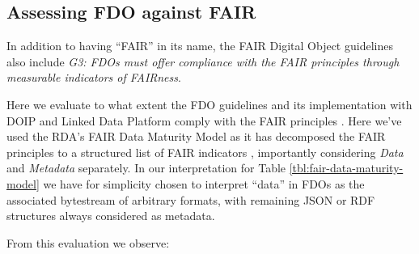 \documentclass[fleqn,10pt,NOlineno]{wlpeerjlua}
\begin{document}



\subsection*{Assessing FDO against FAIR}\label{sec:fair-compare}

In addition to having ``FAIR'' in its name, the FAIR Digital Object guidelines \autocite{fdo-RequirementSpec} also include \emph{G3: FDOs must offer compliance with the FAIR principles through measurable indicators of FAIRness}.

Here we evaluate to what extent the FDO guidelines and its implementation with DOIP and Linked Data Platform \autocite{FDOFramework} comply with the FAIR principles \autocite{wilkinsonFAIRGuidingPrinciples2016e}. Here we've used the RDA's FAIR Data Maturity Model \autocite{groupFAIRDataMaturity2020} as it has decomposed the FAIR principles to a structured list of FAIR indicators \autocite{bahimFAIRDataMaturity2020a}, importantly considering \emph{Data} and \emph{Metadata} separately. In our interpretation for Table \vref{tbl:fair-data-maturity-model} we have for simplicity chosen to interpret ``data'' in FDOs as the associated bytestream of arbitrary formats, with remaining JSON or RDF structures always considered as metadata.



From this evaluation we observe:
\end{document}
